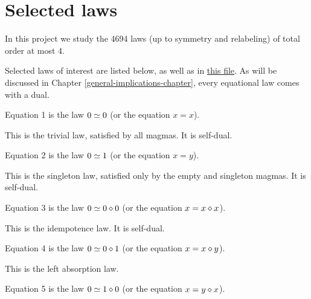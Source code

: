 \chapter{Selected laws}\label{subgraph-eq}

In this project we study the 4694 laws (up to symmetry and relabeling) of total order at most $4$.

Selected laws of interest are listed below, as well as in \href{https://github.com/teorth/equational_theories/blob/main/equational_theories/Equations/Basic.lean}{this file}.  As will be discussed in Chapter \ref{general-implications-chapter}, every equational law comes with a dual.

\begin{definition}[Equation 1]\label{eq1}\leanok{}  Equation 1 is the law $0 \simeq 0$ (or the equation $x=x$).
\end{definition}

This is the trivial law, satisfied by all magmas. It is self-dual.


\begin{definition}[Equation 2]\label{eq2}\leanok{}  Equation 2 is the law $0 \simeq 1$ (or the equation $x=y$).
\end{definition}

This is the singleton law, satisfied only by the empty and singleton magmas.  It is self-dual.

\begin{definition}[Equation 3]\label{eq3}\leanok{}  Equation 3 is the law $0 \simeq 0 \diamond 0$ (or the equation $x = x \diamond x$).
\end{definition}

This is the idempotence law.  It is self-dual.

\begin{definition}[Equation 4]\label{eq4}\leanok{}  Equation 4 is the law $0 \simeq 0 \diamond 1$ (or the equation $x = x \diamond y$).
\end{definition}

This is the left absorption law.

\begin{definition}[Equation 5]\label{eq5}\leanok{}  Equation 5 is the law $0 \simeq 1 \diamond 0$ (or the equation $x = y \diamond x$).
\end{definition}

